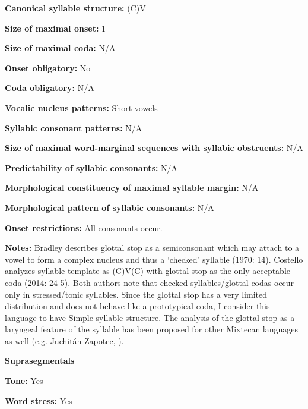 \textbf{Canonical syllable structure:} (C)V \citep[14]{Bradley1970}



\textbf{Size of maximal onset:} 1



\textbf{Size of maximal coda:} N/A



\textbf{Onset obligatory:} No



\textbf{Coda obligatory:} N/A



\textbf{Vocalic nucleus patterns:} Short vowels



\textbf{Syllabic consonant patterns:} N/A



\textbf{Size of maximal word{}-marginal sequences with syllabic obstruents:} N/A



\textbf{Predictability of syllabic consonants:} N/A



\textbf{Morphological constituency of maximal syllable margin:} N/A



\textbf{Morphological pattern of syllabic consonants:} N/A



\textbf{Onset restrictions:} All consonants occur.



\textbf{Notes:} Bradley describes glottal stop as a semiconsonant which may attach to a vowel to form a complex nucleus and thus a ‘checked’ syllable (1970: 14). Costello analyzes syllable template as (C)V(C) with glottal stop as the only acceptable coda (2014: 24-5). Both authors note that checked syllables/glottal codas occur only in stressed/tonic syllables. Since the glottal stop has a very limited distribution and does not behave like a prototypical coda, I consider this language to have Simple syllable structure. The analysis of the glottal stop as a laryngeal feature of the syllable has been proposed for other Mixtecan languages as well (e.g. Juchitán Zapotec, \citealt{MarlettPickett1987}).



\textbf{Suprasegmentals}



\textbf{Tone:} Yes



\textbf{Word stress:} Yes



